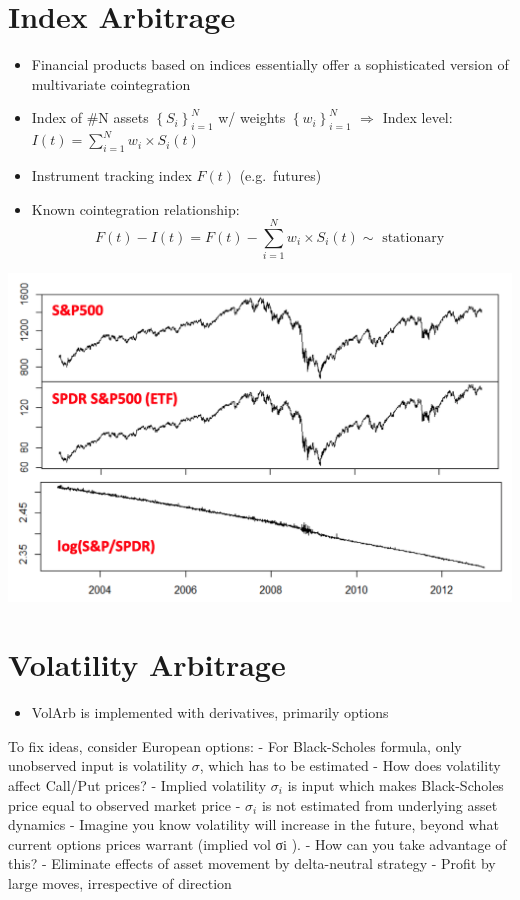 \documentclass[
  oneside]{book}
\providecommand{\tightlist}{%
  \setlength{\itemsep}{0pt}\setlength{\parskip}{0pt}}
\begin{document}
\hypertarget{index-arbitrage}{%
\section{Index Arbitrage}\label{index-arbitrage}}

\begin{itemize}
\tightlist
\item
  Financial products based on indices essentially offer a sophisticated version of multivariate cointegration
\item
  Index of \#N assets \(\left\{S_i\right\}_{i=1}^N\) w/ weights \(\left\{w_i\right\}_{i=1}^N\) \(\Rightarrow\) Index level: \(I(t)=\sum_{i=1}^N w_i \times S_i(t)\)
\item
  Instrument tracking index \(F(t)\) (e.g.~futures)
\item
  Known cointegration relationship:
  \[
  F(t)-I(t)=F(t)-\sum_{i=1}^N w_i \times S_i(t) \sim \text { stationary }
  \]
\end{itemize}

\includegraphics{Notes/Obsidian-Attachments/9-Statistical-Arbitrage-12.png}

\hypertarget{volatility-arbitrage}{%
\section{Volatility Arbitrage}\label{volatility-arbitrage}}

\begin{itemize}
\tightlist
\item
  VolArb is implemented with derivatives, primarily options
\end{itemize}

To fix ideas, consider European options:
- For Black-Scholes formula, only unobserved input is volatility \(\sigma\), which has to be estimated
- How does volatility affect Call/Put prices?
- Implied volatility \(\sigma_i\) is input which makes Black-Scholes price equal to observed market price
- \(\sigma_i\) is not estimated from underlying asset dynamics
- Imagine you know volatility will increase in the future, beyond what current options prices warrant (implied vol σi ).
- How can you take advantage of this?
- Eliminate effects of asset movement by delta-neutral strategy
- Profit by large moves, irrespective of direction
\end{document}

